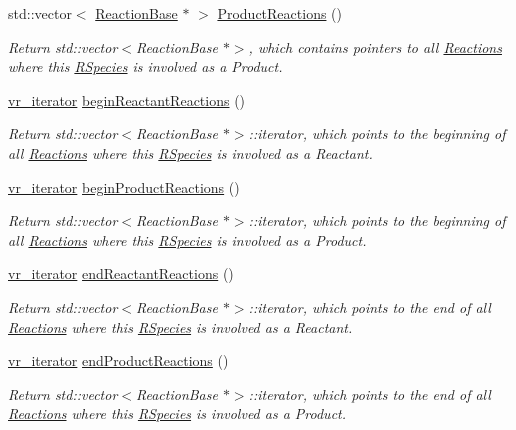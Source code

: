 \begin{DoxyCompactItemize}
std\-::vector$<$ \hyperlink{classchem_1_1ReactionBase}{Reaction\-Base} $\ast$ $>$ \hyperlink{classchem_1_1RSpecies_ab978fcc67f44cf5a2aba3d8281f57dcf}{Product\-Reactions} ()
\begin{DoxyCompactList}\small\item\em Return std\-::vector$<$\-Reaction\-Base $\ast$$>$, which contains pointers to all \hyperlink{classchem_1_1Reaction}{Reactions} where this \hyperlink{classchem_1_1RSpecies}{R\-Species} is involved as a Product. \end{DoxyCompactList}\item 
\hyperlink{namespacechem_a0decff3bb0047ac3a45bc12163f063e4}{vr\-\_\-iterator} \hyperlink{classchem_1_1RSpecies_abb162e65b6a0bb4953be60299e23a8e1}{begin\-Reactant\-Reactions} ()
\begin{DoxyCompactList}\small\item\em Return std\-::vector$<$\-Reaction\-Base $\ast$$>$\-::iterator, which points to the beginning of all \hyperlink{classchem_1_1Reaction}{Reactions} where this \hyperlink{classchem_1_1RSpecies}{R\-Species} is involved as a Reactant. \end{DoxyCompactList}\item 
\hyperlink{namespacechem_a0decff3bb0047ac3a45bc12163f063e4}{vr\-\_\-iterator} \hyperlink{classchem_1_1RSpecies_a28a722faa4f1784cf42cb1aeadee9bcb}{begin\-Product\-Reactions} ()
\begin{DoxyCompactList}\small\item\em Return std\-::vector$<$\-Reaction\-Base $\ast$$>$\-::iterator, which points to the beginning of all \hyperlink{classchem_1_1Reaction}{Reactions} where this \hyperlink{classchem_1_1RSpecies}{R\-Species} is involved as a Product. \end{DoxyCompactList}\item 
\hyperlink{namespacechem_a0decff3bb0047ac3a45bc12163f063e4}{vr\-\_\-iterator} \hyperlink{classchem_1_1RSpecies_a1b228d34e6277a15f672247480f4b51a}{end\-Reactant\-Reactions} ()
\begin{DoxyCompactList}\small\item\em Return std\-::vector$<$\-Reaction\-Base $\ast$$>$\-::iterator, which points to the end of all \hyperlink{classchem_1_1Reaction}{Reactions} where this \hyperlink{classchem_1_1RSpecies}{R\-Species} is involved as a Reactant. \end{DoxyCompactList}\item 
\hyperlink{namespacechem_a0decff3bb0047ac3a45bc12163f063e4}{vr\-\_\-iterator} \hyperlink{classchem_1_1RSpecies_a1b3db9e6c2246f6d1b4d98d344ff9e9e}{end\-Product\-Reactions} ()
\begin{DoxyCompactList}\small\item\em Return std\-::vector$<$\-Reaction\-Base $\ast$$>$\-::iterator, which points to the end of all \hyperlink{classchem_1_1Reaction}{Reactions} where this \hyperlink{classchem_1_1RSpecies}{R\-Species} is involved as a Product. \end{DoxyCompactList}\end{DoxyCompactItemize}
